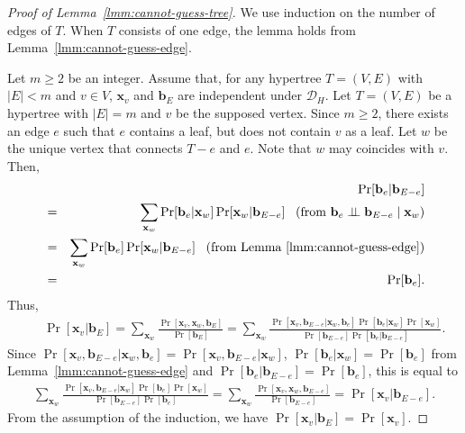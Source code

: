 \documentclass[letterpaper,11pt]{article}
\newcommand{\cald}{\mathcal{D}}
\newcommand{\bfx}{\mathbf{x}}
\newcommand{\bfb}{\mathbf{b}}
\newcommand{\ci}{\perp\!\!\!\perp}
\begin{document}
\begin{proof}[Proof of Lemma~\ref{lmm:cannot-guess-tree}]
  We use induction on the number of edges of $T$.
  When $T$ consists of one edge, 
  the lemma holds from Lemma~\ref{lmm:cannot-guess-edge}.

  Let $m\geq 2$ be an integer.
  Assume that, 
  for any hypertree $T=(V,E)$ with $|E|<m$ and $v\in V$,
  $\bfx_{v}$ and $\bfb_{E}$ are independent under $\cald_H$.
  Let $T=(V,E)$ be a hypertree with $|E|=m$ and $v$ be the supposed vertex.
  Since $m\geq 2$,
  there exists an edge $e$ such that $e$ contains a leaf,
  but does not contain $v$ as a leaf.
  Let $w$ be the unique vertex that connects $T-e$ and $e$.
  Note that $w$ may coincides with $v$.
  Then, 
  \begin{eqnarray*}
    && 
    \Pr[\bfb_e|\bfb_{E-e}]\\
    &=&
    \sum_{\bfx_w}\Pr[\bfb_e|\bfx_w]\Pr[\bfx_w|\bfb_{E-e}]\;\;\;(\mbox{from }\bfb_e \ci \bfb_{E-e} \mid \bfx_w) \\
    &=&
    \sum_{\bfx_w}\Pr[\bfb_e]\Pr[\bfx_w|\bfb_{E-e}]\;\;\;(\mbox{from Lemma}~\ref{lmm:cannot-guess-edge}) \\
    &=&
    \Pr[\bfb_e].
  \end{eqnarray*}
  Thus, 
  \begin{eqnarray*}
    &&
    \Pr[\bfx_v|\bfb_E]
    =
    \sum_{\bfx_w}\frac{\Pr[\bfx_v,\bfx_w,\bfb_E]}{\Pr[\bfb_E]}
    =
    \sum_{\bfx_w}\frac{\Pr[\bfx_v,\bfb_{E-e}|\bfx_w,\bfb_e]\Pr[\bfb_e|\bfx_w]\Pr[\bfx_w]}{\Pr[\bfb_{E-e}]\Pr[\bfb_{e}|\bfb_{E-e}]}.
  \end{eqnarray*}
  Since \(\Pr[\bfx_v,\bfb_{E-e}|\bfx_w,\bfb_e]=\Pr[\bfx_v,\bfb_{E-e}|\bfx_w]\), \(\Pr[\bfb_e|\bfx_w]=\Pr[\bfb_e]\) from Lemma~\ref{lmm:cannot-guess-edge} and \(\Pr[\bfb_e|\bfb_{E-e}]=\Pr[\bfb_e]\), this is equal to
  \begin{eqnarray*}
    \sum_{\bfx_w}\frac{\Pr[\bfx_v,\bfb_{E-e}|\bfx_w]\Pr[\bfb_e]\Pr[\bfx_w]}{\Pr[\bfb_{E-e}]\Pr[\bfb_{e}]}
    =
    \sum_{\bfx_w}\frac{\Pr[\bfx_v,\bfx_w,\bfb_{E-e}]}{\Pr[\bfb_{E-e}]}
    =
    \Pr[\bfx_v|\bfb_{E-e}].
  \end{eqnarray*}
  From the assumption of the induction, we have \(\Pr[\bfx_v|\bfb_E]=\Pr[\bfx_v]\).
\end{proof}
\end{document}
